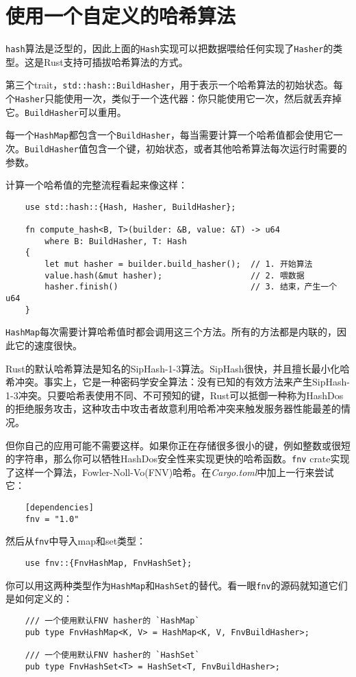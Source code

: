 \section{使用一个自定义的哈希算法}

\texttt{hash}算法是泛型的，因此上面的\texttt{Hash}实现可以把数据喂给任何实现了\texttt{Hasher}的类型。这是Rust支持可插拔哈希算法的方式。

第三个trait，\texttt{std::hash::BuildHasher}，用于表示一个哈希算法的初始状态。每个\texttt{Hasher}只能使用一次，类似于一个迭代器：你只能使用它一次，然后就丢弃掉它。\texttt{BuildHasher}可以重用。

每一个\texttt{HashMap}都包含一个\texttt{BuildHasher}，每当需要计算一个哈希值都会使用它一次。\texttt{BuildHasher}值包含一个键，初始状态，或者其他哈希算法每次运行时需要的参数。

计算一个哈希值的完整流程看起来像这样：
\begin{verbatim}
    use std::hash::{Hash, Hasher, BuildHasher};

    fn compute_hash<B, T>(builder: &B, value: &T) -> u64
        where B: BuildHasher, T: Hash
    {
        let mut hasher = builder.build_hasher();  // 1. 开始算法
        value.hash(&mut hasher);                  // 2. 喂数据
        hasher.finish()                           // 3. 结束，产生一个u64
    }
\end{verbatim}

\texttt{HashMap}每次需要计算哈希值时都会调用这三个方法。所有的方法都是内联的，因此它的速度很快。

Rust的默认哈希算法是知名的SipHash-1-3算法。SipHash很快，并且擅长最小化哈希冲突。事实上，它是一种密码学安全算法：没有已知的有效方法来产生SipHash-1-3冲突。只要哈希表使用不同、不可预知的键，Rust可以抵御一种称为HashDos的拒绝服务攻击，这种攻击中攻击者故意利用哈希冲突来触发服务器性能最差的情况。

但你自己的应用可能不需要这样。如果你正在存储很多很小的键，例如整数或很短的字符串，那么你可以牺牲HashDos安全性来实现更快的哈希函数。\texttt{fnv} crate实现了这样一个算法，Fowler-Noll-Vo(FNV)哈希。在\emph{Cargo.toml}中加上一行来尝试它：
\begin{verbatim}
    [dependencies]
    fnv = "1.0"
\end{verbatim}

然后从\texttt{fnv}中导入map和set类型：
\begin{verbatim}
    use fnv::{FnvHashMap, FnvHashSet};
\end{verbatim}

你可以用这两种类型作为\texttt{HashMap}和\texttt{HashSet}的替代。看一眼\texttt{fnv}的源码就知道它们是如何定义的：
\begin{verbatim}
    /// 一个使用默认FNV hasher的 `HashMap`
    pub type FnvHashMap<K, V> = HashMap<K, V, FnvBuildHasher>;

    /// 一个使用默认FNV hasher的 `HashSet`
    pub type FnvHashSet<T> = HashSet<T, FnvBuildHasher>;
\end{verbatim}

